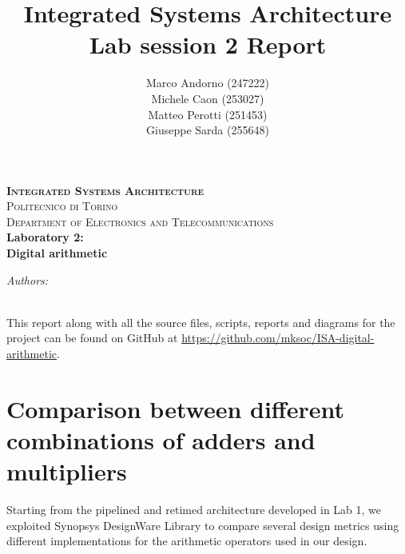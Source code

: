 \documentclass[a4paper]{article}
\title{Integrated Systems Architecture\\Lab session 2 Report}
\author{Marco Andorno (247222)\\Michele Caon (253027)\\Matteo Perotti (251453)\\Giuseppe Sarda (255648)}
\begin{document}
\begin{center}
	\thispagestyle{empty}
	
	
	\textbf{\textsc{\Large Integrated Systems Architecture}}\\[1.0cm] 
	\textsc{\Large Politecnico di Torino}\\[0.5cm] 
	\textsc{\large Department of Electronics and Telecommunications
	}\\[1cm] 
	
	
	\huge \textbf{Laboratory 2: \\ Digital arithmetic}
	
	\end{center}
	
	
	\vfill
	\large
	\begin{flushleft}
	\makeatletter
	\emph{Authors:}\\
	\@author \\
	\vspace{1cm}
	\normalsize \@date
	\makeatother
	\end{flushleft} 
	
	\newpage
	This report along with all the source files, scripts, reports and diagrams for the project can be found on GitHub at \url{https://github.com/mksoc/ISA-digital-arithmetic}.
	\tableofcontents
	\newpage

\section{Comparison between different combinations of adders and multipliers}
Starting from the pipelined and retimed architecture developed in Lab 1, we exploited Synopsys DesignWare Library to compare several design metrics using different implementations for the arithmetic operators used in our design.
\end{document}

